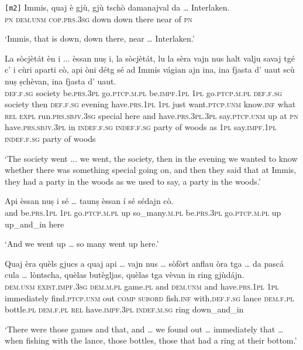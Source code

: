 \begin{linenumbers}
\gll  \texttt{[m2]}  Immis, quaj è gjù, gjù tschò damanajval da … Interlaken.\\
{} \textsc{pn} \textsc{dem.unm} \textsc{cop.prs.3sg} down down there near of {} \textsc{pn} \\
\end{linenumbers}
\medskip
\glt `Immis, that is down, down there, near … Interlaken.'
\medskip


\begin{linenumbers}
	\gll La sòcjètát èn i ... èssan nuṣ i, la sòcjètát, lu la sèra vajn nus halt valju savaj tgé c' i cùri aparti cò, api òni détg sé ad Immis vágian ajn ina, ina fjasta d' uaut scù nuṣ ṣchèvan, ina fjasta d' uaut.\\
	\textsc{def.f.sg} society be.\textsc{prs.3pl} go.\textsc{ptcp.m.pl} {} be.\textsc{impf.1pl} \textsc{1pl} go.\textsc{ptcp.m.pl} \textsc{def.f.sg} society then \textsc{def.f.sg} evening have.\textsc{prs.1pl} \textsc{1pl} just want.\textsc{ptcp.unm} know.\textsc{inf} what \textsc{rel} \textsc{expl} run.\textsc{prs.sbjv.3sg} special here and have.\textsc{prs.3pl.3pl} say.\textsc{ptcp.unm} up at \textsc{pn} have.\textsc{prs.sbjv.3pl} in \textsc{indef.f.sg} \textsc{indef.f.sg} party of woods as \textsc{1pl} say.\textsc{impf.1pl} \textsc{indef.f.sg} party of woods\\
\end{linenumbers}
\medskip
\glt `The society went ... we went, the society, then in the evening we wanted to know whether there was something special going on, and then they said that at Immis, they had a party in the woods as we used to say, a party in the woods.'
\medskip

\begin{linenumbers}
\gll    Api èssan nuṣ i sé … taunṣ èssan í sé sédajn cò.\\
and be.\textsc{prs.1pl} \textsc{1pl} go.\textsc{ptcp.m.pl} up {} so\_many.\textsc{m.pl} be.\textsc{prs.3pl} go.\textsc{ptcp.m.pl} up up\_and\_in here\\
\end{linenumbers}
\medskip
\glt `And we went up … so many went up here.'
\medskip

\begin{linenumbers}
\gll    Quaj èra quèls gjucs a quaj api … vajn nus … sòfòrt\footnotemark{} anflau òra tga … da pascá cula … lòntscha, quèlas butègljas, quèlas tga vèvan in ring gjùdájn.\\
\textsc{dem.unm} \textsc{exist.impf.3sg} \textsc{dem.m.pl} game.\textsc{pl} and  \textsc{dem.unm} and {} have.\textsc{prs.1pl} \textsc{1pl} {} immediately find.\textsc{ptcp.unm} out \textsc{comp} {} \textsc{subord} fish.\textsc{inf} with.\textsc{def.f.sg} {} lance \textsc{dem.f.pl} bottle.\textsc{pl} \textsc{dem.f.pl} \textsc{rel} have.\textsc{impf.3pl} \textsc{indef.m.sg} ring down\_and\_in\\
\end{linenumbers}
\medskip
\glt `There were those games and that, and … we found out … immediately that … when fishing with the lance, those bottles, those that had a ring at their bottom.'
\medskip

